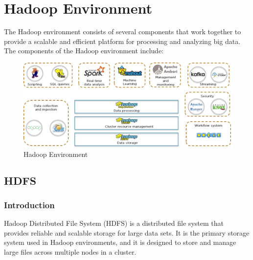 \documentclass[12pt]{article}
\begin{document}
\section{Hadoop Environment}
The Hadoop environment consists of several components that work together to provide a scalable and efficient platform for processing and
analyzing big data. The components of the Hadoop environment include:
\begin{figure}[h!]
    \centering
    \includegraphics[scale = 0.3]{images/Environment.png}
    \caption{Hadoop Environment}
\end{figure}
\subsection{HDFS}
\subsubsection{Introduction}
Hadoop Distributed File System (HDFS) is a distributed file system that provides reliable and scalable storage for large data sets. It is the primary storage system used in Hadoop environments, and it is designed to store and manage large files across multiple nodes in a cluster. 
\end{document}
